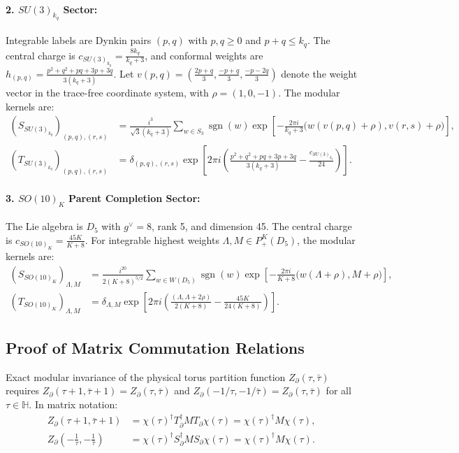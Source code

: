 \documentclass[11pt]{article}
\theoremstyle{plain}
\begin{document}
\paragraph{2. $SU(3)_{k_q}$ Sector:} Integrable labels are Dynkin pairs $(p, q)$ with $p, q \ge 0$ and $p + q \le k_q$. The central charge is $c_{SU(3)_{k_q}} = \frac{8k_q}{k_q + 3}$, and conformal weights are $h_{(p,q)} = \frac{p^2 + q^2 + pq + 3p + 3q}{3(k_q + 3)}$. Let $v(p,q) = \left( \frac{2p+q}{3}, \frac{-p+q}{3}, \frac{-p-2q}{3} \right)$ denote the weight vector in the trace-free coordinate system, with $\rho = (1, 0, -1)$. The modular kernels are:
\begin{align}
(S_{SU(3)_{k_q}})_{(p,q),(r,s)} &= \frac{i^3}{\sqrt{3}(k_q + 3)} \sum_{w \in S_3} \operatorname{sgn}(w) \exp\left[ -\frac{2\pi i}{k_q + 3} \Big( w(v(p,q) + \rho), v(r,s) + \rho \Big) \right], \label{eq:S_su3} \\
(T_{SU(3)_{k_q}})_{(p,q),(r,s)} &= \delta_{(p,q),(r,s)} \exp\left[ 2\pi i \left( \frac{p^2 + q^2 + pq + 3p + 3q}{3(k_q + 3)} - \frac{c_{SU(3)_{k_q}}}{24} \right) \right]. \label{eq:T_su3}
\end{align}

\paragraph{3. $SO(10)_K$ Parent Completion Sector:} The Lie algebra is $D_5$ with $g^\vee = 8$, rank 5, and dimension 45. The central charge is $c_{SO(10)_K} = \frac{45K}{K + 8}$. For integrable highest weights $\Lambda, M \in P_+^K(D_5)$, the modular kernels are:
\begin{align}
(S_{SO(10)_K})_{\Lambda, M} &= \frac{i^{20}}{2(K + 8)^{5/2}} \sum_{w \in W(D_5)} \operatorname{sgn}(w) \exp\left[ -\frac{2\pi i}{K + 8} \Big( w(\Lambda + \rho), M + \rho \Big) \right], \label{eq:S_so10} \\
(T_{SO(10)_K})_{\Lambda, M} &= \delta_{\Lambda, M} \exp\left[ 2\pi i \left( \frac{(\Lambda, \Lambda + 2\rho)}{2(K + 8)} - \frac{45K}{24(K + 8)} \right) \right]. \label{eq:T_so10}
\end{align}

\subsection{Proof of Matrix Commutation Relations}
Exact modular invariance of the physical torus partition function $Z_{\partial}(\tau, \bar{\tau})$ requires $Z_{\partial}(\tau + 1, \bar{\tau} + 1) = Z_{\partial}(\tau, \bar{\tau})$ and $Z_{\partial}(-1/\tau, -1/\bar{\tau}) = Z_{\partial}(\tau, \bar{\tau})$ for all $\tau \in \mathbb{H}$. In matrix notation:
\begin{align}
Z_{\partial}(\tau + 1, \bar{\tau} + 1) &= \chi(\tau)^\dagger T_{\partial}^\dagger M T_{\partial} \chi(\tau) = \chi(\tau)^\dagger M \chi(\tau), \label{eq:T_invariance} \\
Z_{\partial}\left(-\frac{1}{\tau}, -\frac{1}{\bar{\tau}}\right) &= \chi(\tau)^\dagger S_{\partial}^\dagger M S_{\partial} \chi(\tau) = \chi(\tau)^\dagger M \chi(\tau). \label{eq:S_invariance}
\end{align}
\end{document}
